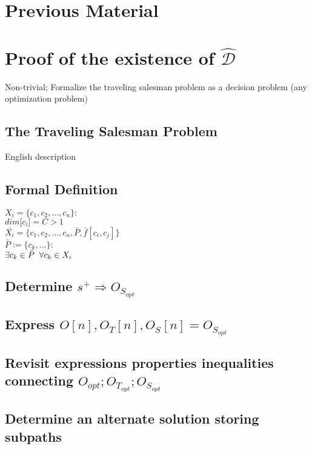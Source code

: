 \documentclass[11pt]{article}
\begin{document}
\newpage
\section*{Previous Material}
\section{Proof of the existence of $\hat{\mathcal{D}}$}
Non-trivial; Formalize the traveling salesman problem as a decision problem (any optimization problem)

\subsection{The Traveling Salesman Problem}
English description

\subsection{Formal Definition}
\begin{center}
$
X_i = \{ c_1,c_2,...,c_n \} :
$
\\ \vspace{2mm}
$
dim\lbrack c_i \rbrack = C > 1
$
\\ \vspace{4mm} 
$
\bar{X_i} = \{ c_1,c_2,...,c_n,\bar{P},\bar{f}[c_i,c_j] \}
$
\\ \vspace{2mm}
$
\bar{P} := \{c_k,...\} :
$
\\ \vspace{2mm}
$
\exists c_k \in \bar{P} \hspace{2mm} \forall c_k \in X_i
$
\end{center}

\subsection{Determine $s^+ \Longrightarrow O_{S_{opt}}$}
\subsection{Express $O[n],O_T[n],O_S[n] =  O_{S_{opt}}$}
\subsection{Revisit expressions properties inequalities connecting $O_{opt}; O_{T_{opt}}; O_{S_{opt}}$}
\subsection{Determine an alternate solution storing subpaths}
\end{document}
